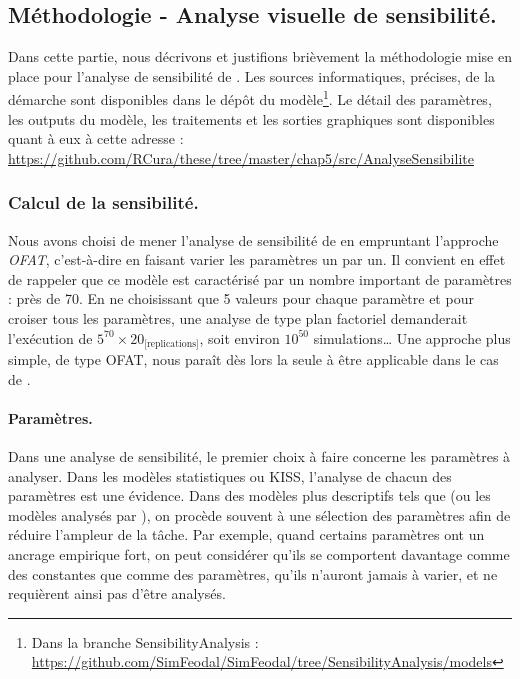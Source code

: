 \subsection{Méthodologie - Analyse visuelle de sensibilité.}

Dans cette partie, nous décrivons et justifions brièvement la méthodologie mise en place pour l'analyse de sensibilité de \simfeodal{}.
Les sources informatiques, précises, de la démarche sont disponibles dans le dépôt du modèle\footnote{
Dans la branche \og SensibilityAnalysis\fg{} :\\ \href{https://github.com/SimFeodal/SimFeodal/blob/SensibilityAnalysis/models/AnaSensib_6_5.gaml}{https://github.com/SimFeodal/SimFeodal/tree/SensibilityAnalysis/models}
}.
Le détail des paramètres, les outputs du modèle, les traitements et les sorties graphiques sont disponibles quant à eux à cette adresse :\\ \href{https://github.com/RCura/these/tree/master/chap5/src/AnalyseSensibilite}{https://github.com/RCura/these/tree/master/chap5/src/AnalyseSensibilite}

\subsubsection{Calcul de la sensibilité.}

Nous avons choisi de mener l'analyse de sensibilité de \simfeodal{} en empruntant l'approche \textit{OFAT}, c'est-à-dire en faisant varier les paramètres un par un.
Il convient en effet de rappeler que ce modèle est caractérisé par un nombre important de paramètres : près de 70.
En ne choisissant que 5 valeurs pour chaque paramètre et pour croiser tous les paramètres, une analyse de type plan factoriel demanderait l'exécution de $5^{70} \times 20_{\text{[replications]}}$, soit environ $10^{50}$ simulations\ldots{}
Une approche plus simple, de type OFAT, nous paraît dès lors la seule  à être applicable dans le cas de \simfeodal{}.


\paragraph{Paramètres.}
Dans une analyse de sensibilité, le premier choix à faire concerne les paramètres à analyser.
Dans les modèles statistiques ou KISS, l'analyse de chacun des paramètres est une évidence.
Dans des modèles plus descriptifs tels que \simfeodal{} (ou les modèles analysés par \textcite{hirtzel2015exploration}), on procède souvent à une sélection des paramètres afin de réduire l'ampleur de la tâche.
Par exemple, quand certains paramètres ont un ancrage empirique fort, on peut considérer qu'ils se comportent davantage comme des constantes que comme des paramètres, qu'ils n'auront jamais à varier, et ne requièrent ainsi pas d'être analysés.

